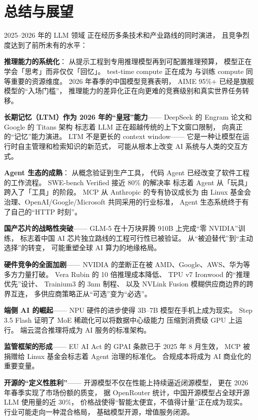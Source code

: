 \section{总结与展望}

2025--2026 年的 LLM 领域
正在经历多条技术和产业路线的同时演进，
且竞争烈度达到了前所未有的水平：

\textbf{推理能力的系统化}：
从提示工程到专用推理模型再到可配置推理预算，
模型正在学会「思考」而非仅仅「回忆」。
test-time compute 正在成为
与训练 compute 同等重要的资源维度。
2026 年春季的中国模型竞赛表明，
AIME 95\%+ 已经是旗舰模型的“入场门槛”，
推理能力的差异化正在向更难的竞赛级别和真实世界任务转移。

\textbf{长期记忆（LTM）作为 2026 年的“皇冠”能力}——
DeepSeek 的 Engram 论文和 Google 的 Titans 架构
标志着 LLM 正在超越传统的上下文窗口限制，
向真正的“记忆”能力演进。
LTM 不是更长的 context window——
它是一种让模型在运行时自主管理和检索知识的新范式，
可能从根本上改变 AI 系统与人类的交互方式。

\textbf{Agent 生态的成熟}：
从概念验证到生产工具，
代码 Agent 已经改变了软件工程的工作流程。
SWE-bench Verified 接近 80\% 的解决率
标志着 Agent 从「玩具」跨入了「工具」的阶段。
MCP 从 Anthropic 的专有协议成长为
由 Linux 基金会治理、OpenAI/Google/Microsoft 共同采用的行业标准，
Agent 生态系统终于有了自己的“HTTP 时刻”。

\textbf{国产芯片的战略性突破}——
GLM-5 在十万块昇腾 910B 上完成“零 NVIDIA”训练，
标志着中国 AI 芯片独立路线的工程可行性已被验证。
从“被迫替代”到“主动选择”的转变，
可能重塑全球 AI 算力的地缘格局。

\textbf{硬件竞争的全面加剧}——
NVIDIA 的垄断正在被 AMD、Google、AWS、华为等多方力量打破。
Vera Rubin 的 10 倍推理成本降低、
TPU v7 Ironwood 的“推理优先”设计、
Trainium3 的 3nm 制程、
以及 NVLink Fusion 模糊供应商边界的跨界互连，
多供应商策略正从“可选”变为“必选”。

\textbf{端侧 AI 的崛起}——
NPU 硬件的进步使得 3B--7B 模型在手机上成为现实。
Step 3.5 Flash 证明了 MoE 稀疏化可以将数据中心级能力
压缩到消费级 GPU 上运行。
端云混合推理将成为 AI 服务的标准架构。

\textbf{监管框架的形成}——
EU AI Act 的 GPAI 条款已于 2025 年 8 月生效，
MCP 被捐赠给 Linux 基金会标志着 Agent 治理的标准化。
合规成本将成为 AI 商业化的重要变量。

\textbf{开源的“定义性胜利”}——
开源模型不仅在性能上持续逼近闭源模型，
更在 2026 年春季实现了市场份额的质变，
据 OpenRouter 统计，中国开源模型占全球开源 LLM 使用量的近 30\%，
价格战使得“智能太便宜，不值得计量”正在成为现实。
行业可能走向一种混合格局，
基础模型开源，增值服务闭源。

